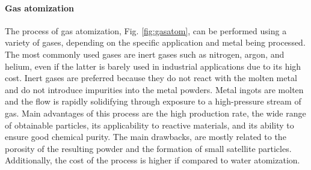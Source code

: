 \paragraph{Gas atomization} The process of gas atomization, Fig. \ref{fig:gasatom}, can be performed using a variety of gases, depending on the specific application and metal being processed. The most commonly used gases are inert gases such as nitrogen, argon, and helium, even if the latter is barely used in industrial applications due to its high cost. Inert gases are preferred because they do not react with the molten metal and do not introduce impurities into the metal powders. Metal ingots are molten and the flow is rapidly solidifying through exposure to a high-pressure stream of gas. Main advantages of this process are the high production rate, the wide range of obtainable particles, its applicability to reactive materials, and its ability to ensure good chemical purity. The main drawbacks, are mostly related to the porosity of the resulting powder and the formation of small satellite particles. Additionally, the cost of the process is higher if compared to water atomization.
